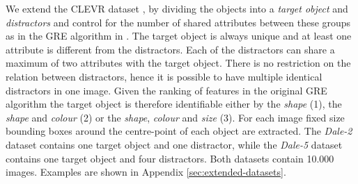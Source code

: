 \documentclass[11pt]{article}
\begin{document}
We extend the CLEVR dataset \citep{Johnson2016}, by dividing the objects into a \emph{target object} and \emph{distractors}
and control for the number of shared attributes between these groups as %
in the GRE algorithm in \citep{Dale1995}.
The target object is always unique and at least one attribute is different from the distractors.
Each of the distractors can share a maximum of two attributes with the target object.
There is no restriction on the relation between distractors, hence it is possible to have multiple identical distractors in one image.
Given the ranking of features in the original GRE algorithm the target object is therefore identifiable either by the \emph{shape} (1), the \emph{shape} and \emph{colour} (2) or the \emph{shape}, \emph{colour} and \emph{size} (3).
For each image fixed size bounding boxes around the centre-point of each object are extracted.
%
The \emph{Dale-2} dataset contains one target object and one distractor, while the \emph{Dale-5} dataset contains one target object and four distractors.
Both datasets contain 10.000 images.
Examples are shown in 
Appendix \ref{sec:extended-datasets}. %

\end{document}
